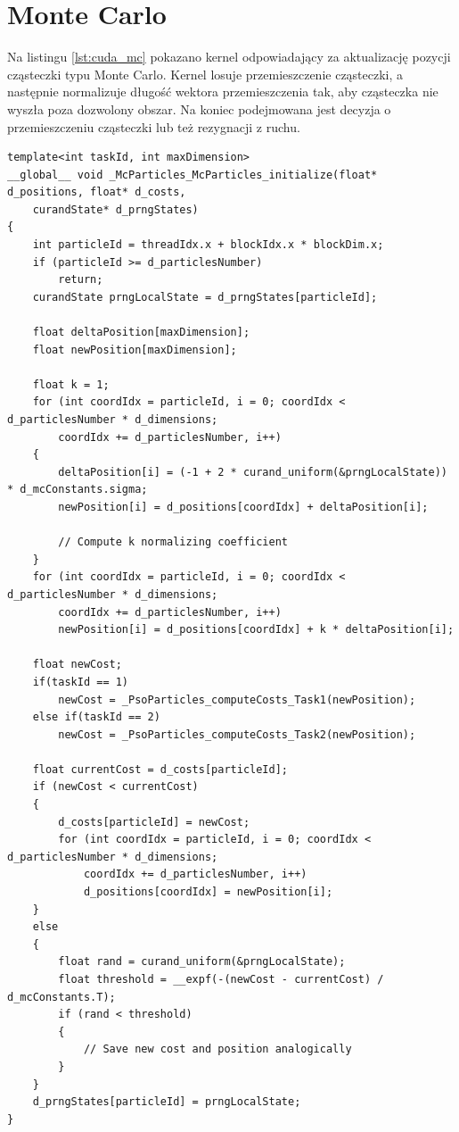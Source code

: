 \documentclass[11pt, a4paper, oneside]{article}
\begin{document}
\section{Monte Carlo}
Na listingu \ref{lst:cuda_mc} pokazano kernel odpowiadający za aktualizację pozycji cząsteczki typu Monte Carlo. Kernel losuje przemieszczenie cząsteczki, a następnie normalizuje długość wektora przemieszczenia tak, aby cząsteczka nie wyszła poza dozwolony obszar. Na koniec podejmowana jest decyzja o przemieszczeniu cząsteczki lub też rezygnacji z ruchu.

\begin{lstlisting}[style=mycpp, label=lst:cuda_mc, caption={Kernel CUDA aktualizujący cząsteczkę Monte Carlo.}]
template<int taskId, int maxDimension>
__global__ void _McParticles_McParticles_initialize(float* d_positions, float* d_costs,
	curandState* d_prngStates)
{
	int particleId = threadIdx.x + blockIdx.x * blockDim.x;
	if (particleId >= d_particlesNumber)
		return;
	curandState prngLocalState = d_prngStates[particleId];

	float deltaPosition[maxDimension];
	float newPosition[maxDimension];

	float k = 1;
	for (int coordIdx = particleId, i = 0; coordIdx < d_particlesNumber * d_dimensions;
		coordIdx += d_particlesNumber, i++)
	{
		deltaPosition[i] = (-1 + 2 * curand_uniform(&prngLocalState)) * d_mcConstants.sigma;
		newPosition[i] = d_positions[coordIdx] + deltaPosition[i];

		// Compute k normalizing coefficient 
	}
	for (int coordIdx = particleId, i = 0; coordIdx < d_particlesNumber * d_dimensions;
		coordIdx += d_particlesNumber, i++)
		newPosition[i] = d_positions[coordIdx] + k * deltaPosition[i];

	float newCost;
	if(taskId == 1)
		newCost = _PsoParticles_computeCosts_Task1(newPosition);
	else if(taskId == 2)
		newCost = _PsoParticles_computeCosts_Task2(newPosition);

	float currentCost = d_costs[particleId];
	if (newCost < currentCost)
	{
		d_costs[particleId] = newCost;
		for (int coordIdx = particleId, i = 0; coordIdx < d_particlesNumber * d_dimensions;
			coordIdx += d_particlesNumber, i++)
			d_positions[coordIdx] = newPosition[i];
	}
	else
	{
		float rand = curand_uniform(&prngLocalState);
		float threshold = __expf(-(newCost - currentCost) / d_mcConstants.T);
		if (rand < threshold)
		{
			// Save new cost and position analogically
		}
	}
	d_prngStates[particleId] = prngLocalState;
}
\end{lstlisting}
\end{document}
